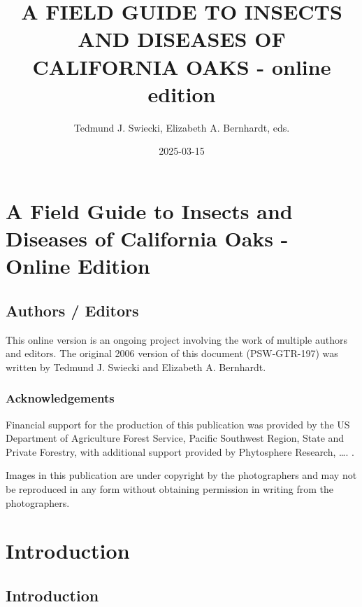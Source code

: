 \documentclass[
]{book}
\title{A FIELD GUIDE TO INSECTS AND DISEASES OF CALIFORNIA OAKS - online edition}
\author{Tedmund J. Swiecki, Elizabeth A. Bernhardt, eds.}
\date{2025-03-15}
\begin{document}
\maketitle

{
\setcounter{tocdepth}{1}
\tableofcontents
}
\part*{A Field Guide to Insects and Diseases of California Oaks - Online Edition}\label{part-a-field-guide-to-insects-and-diseases-of-california-oaks---online-edition}

\chapter*{Authors / Editors}\label{authors-editors}

This online version is an ongoing project involving the work of multiple authors and editors. The original 2006 version of this document (PSW-GTR-197) was written by Tedmund J. Swiecki and Elizabeth A. Bernhardt.

\section*{Acknowledgements}\label{acknowledgements}

Financial support for the production of this publication was provided by the US Department of Agriculture Forest Service, Pacific Southwest Region, State and Private Forestry, with additional support provided by Phytosphere Research, \ldots. .

Images in this publication are under copyright by the photographers and may not be reproduced in any form without obtaining permission in writing from the photographers.

\part*{Introduction}\label{part-introduction}

\chapter*{Introduction}\label{introduction}
\end{document}
